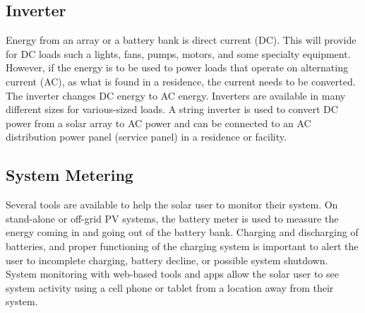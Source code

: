 
\subsection{Inverter}
Energy from an array or a battery bank is direct current
(DC). This will provide for DC loads such a lights, fans,
pumps, motors, and some specialty equipment. However,
if the energy is to be used to power loads that operate on
alternating current (AC), as what is found in a residence, the
current needs to be converted. The inverter changes DC energy
to AC energy. Inverters are available in many different sizes
for various-sized loads.
A string inverter is used to convert DC power from a solar
array to AC power and can be connected to an AC distribution
power panel (service panel) in a residence or facility.


\subsection{System Metering}
Several tools are available to help the solar user to monitor
their system. On stand-alone or off-grid PV systems, the
battery meter is used to measure the energy coming in and
going out of the battery bank. Charging and discharging of
batteries, and proper functioning of the charging system is
important to alert the user to incomplete charging, battery
decline, or possible system shutdown. System monitoring
with web-based tools and apps allow the solar user to see
system activity using a cell phone or tablet from a location
away from their system.